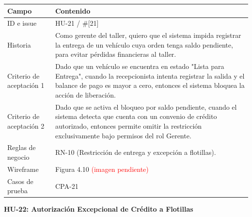 {\def\LTcaptype{none} %
\begin{longtable}[]{@{}
  >{\raggedright\arraybackslash}p{}
  >{\raggedright\arraybackslash}p{}@{}}
\toprule\noalign{}
\begin{minipage}[b]{\linewidth}\raggedright
\textbf{Campo}
\end{minipage} & \begin{minipage}[b]{\linewidth}\raggedright
\textbf{Contenido}
\end{minipage} \\
\midrule\noalign{}
\endhead
\bottomrule\noalign{}
\endlastfoot
ID e issue & HU-21 / \#{[}21{]} \\
Historia & Como gerente del taller, quiero que el sistema impida
registrar la entrega de un vehículo cuya orden tenga saldo pendiente,
para evitar pérdidas financieras al taller. \\
Criterio de aceptación 1 & Dado que un vehículo se encuentra en estado
"Lista para Entrega", cuando la recepcionista intenta registrar la
salida y el balance de pago es mayor a cero, entonces el sistema bloquea
la acción de liberación. \\
Criterio de aceptación 2 & Dado que se activa el bloqueo por saldo
pendiente, cuando el sistema detecta que cuenta con un convenio de
crédito autorizado, entonces permite omitir la restricción
exclusivamente bajo permisos del rol Gerente. \\
Reglas de negocio & RN-10 (Restricción de entrega y excepción a
flotillas). \\
Wireframe & Figura 4.10 \textcolor{red}{(imagen pendiente)} \\
Casos de prueba & CPA-21 \\
\end{longtable}
}

\textbf{HU-22: Autorización Excepcional de Crédito a Flotillas}

